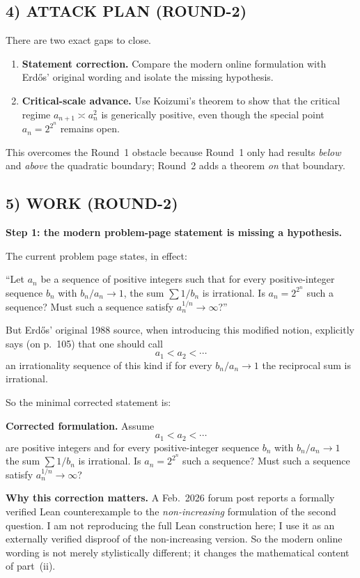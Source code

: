 \subsection*{4) ATTACK PLAN (ROUND-2)}

There are two exact gaps to close.

\begin{enumerate}
\item \textbf{Statement correction.}  Compare the modern online formulation with Erd\H{o}s' original wording and isolate the missing hypothesis.
\item \textbf{Critical-scale advance.}  Use Koizumi's theorem to show that the critical regime $a_{n+1}\asymp a_n^2$ is generically positive, even though the special point $a_n=2^{2^n}$ remains open.
\end{enumerate}

This overcomes the Round~1 obstacle because Round~1 only had results \emph{below} and \emph{above} the quadratic boundary; Round~2 adds a theorem \emph{on} that boundary.

\subsection*{5) WORK (ROUND-2)}

\medskip
\noindent
\textbf{Step 1: the modern problem-page statement is missing a hypothesis.}

The current problem page states, in effect:

\medskip
\noindent
``Let $a_n$ be a sequence of positive integers such that for every positive-integer sequence $b_n$ with $b_n/a_n\to 1$, the sum $\sum 1/b_n$ is irrational.  Is $a_n=2^{2^n}$ such a sequence?  Must such a sequence satisfy $a_n^{1/n}\to\infty$?''

\medskip
\noindent
But Erd\H{o}s' original 1988 source, when introducing this modified notion, explicitly says (on p.~105) that one should call
\[
a_1<a_2<\cdots
\]
an irrationality sequence of this kind if for every $b_n/a_n\to 1$ the reciprocal sum is irrational.

So the minimal corrected statement is:

\medskip
\noindent
\textbf{Corrected formulation.}
Assume
\[
a_1<a_2<\cdots
\]
are positive integers and for every positive-integer sequence $b_n$ with $b_n/a_n\to 1$ the sum $\sum 1/b_n$ is irrational.  Is $a_n=2^{2^n}$ such a sequence?  Must such a sequence satisfy $a_n^{1/n}\to\infty$?

\medskip
\noindent
\textbf{Why this correction matters.}
A Feb.~2026 forum post reports a formally verified Lean counterexample to the \emph{non-increasing} formulation of the second question.  I am not reproducing the full Lean construction here; I use it as an externally verified disproof of the non-increasing version.  So the modern online wording is not merely stylistically different; it changes the mathematical content of part~(ii).

